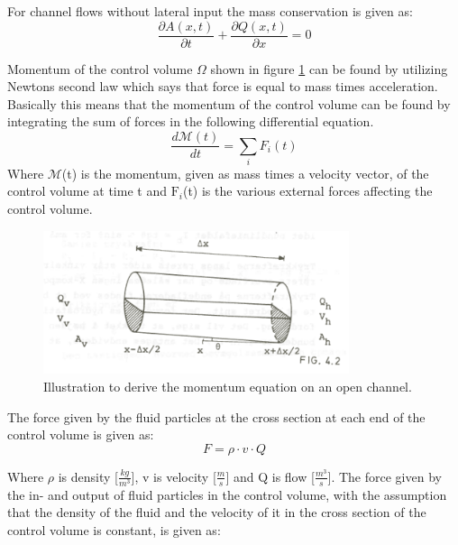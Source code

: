 For channel flows without lateral input the mass conservation is given as:
\begin{equation}	
\boxed{\frac{\partial A(x,t)}{\partial t} + \frac{\partial Q(x,t)}{\partial x}=0}
\label{saintbernard_mass}
\end{equation}


Momentum of the control volume $\Omega$ shown in figure \ref{fig:momentum_picture} can be found by utilizing Newtons second law which says that force is equal to mass times acceleration.
Basically this means that the momentum of the control volume can be found by integrating the sum of forces in the following differential equation.
\begin{equation}\label{eq:momentum_eq}
	\frac{d \mathcal{M}(t)}{dt} = \sum_{i}F_i(t)
\end{equation} 
Where $\mathcal{M}$(t) is the momentum, given as mass times a velocity vector, of the control volume at time t and $\text{F}_i$(t) is the various external forces affecting the control volume.

\begin{figure}[H]
\centering
\includegraphics[width=0.8\textwidth]{report/modeling/pictures/momentum_picture.png}
\caption{Illustration to derive the momentum equation on an open channel.}
\label{fig:momentum_picture}
\end{figure}


The force given by the fluid particles at the cross section at each end of the control volume is given as:
\begin{equation}
	F= \rho \cdot v \cdot Q 
\end{equation}

Where $\rho$ is density [$\frac{kg}{m^3}$], v is velocity [$\frac{m}{s}$] and Q is flow [$\frac{m^3}{s}$].
The force given by the in- and output of fluid particles in the control volume, with the assumption that the density of the fluid and the velocity of it in the cross section of the control volume is constant, is given as:

